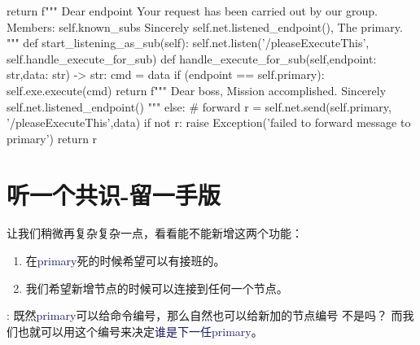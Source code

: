 \documentclass[dvipsnames]{ctexart}
\newcommand{\mycola}{MidnightBlue}
\newcommand{\cola}[1]{\textcolor{\mycola}{#1}}
\begin{document}
\begin{simplepy}
        return f"""
        Dear {endpoint}
             Your request has been carried out by our group.
             Members: {self.known_subs}
                 Sincerely
                 {self.net.listened_endpoint()}, The primary.
        """
    def start_listening_as_sub(self):
        self.net.listen('/pleaseExecuteThis',
                        self.handle_execute_for_sub)
    def handle_execute_for_sub(self,endpoint: str,data: str) -> str:
        cmd = data
        if (endpoint == self.primary):
            self.exe.execute(cmd)
            return f"""
            Dear boss,
                 Mission accomplished.
                     Sincerely
                     {self.net.listened_endpoint()}
            """
        else:
            # forward
            r = self.net.send(self.primary,
                                 '/pleaseExecuteThis',data)
            if not r:
                raise Exception('failed to forward message to primary')
            return r
\end{simplepy}

\section{听一个共识-留一手版}

让我们稍微再复杂复杂一点，看看能不能新增这两个功能：
\begin{enumerate}
\item 在\cola{primary}死的时候希望可以有接班的。
\item 我们希望新增节点的时候可以连接到任何一个节点。
\end{enumerate}
 : 既然\cola{primary}可以给命令编号，那么自然也可以给新加的节点编号
不是吗？ 而我们也就可以用这个编号来决定\cola{谁是下一任primary}。
\end{document}
